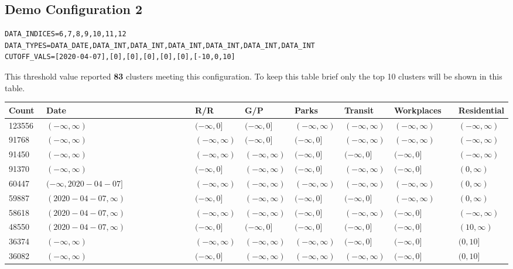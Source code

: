 \documentclass{article}
\begin{document}
\subsection{Demo Configuration 2}
\begin{center}
\footnotesize{
\begin{lstlisting}
DATA_INDICES=6,7,8,9,10,11,12
DATA_TYPES=DATA_DATE,DATA_INT,DATA_INT,DATA_INT,DATA_INT,DATA_INT,DATA_INT
CUTOFF_VALS=[2020-04-07],[0],[0],[0],[0],[0],[-10,0,10]
\end{lstlisting}
}
\end{center}

This threshold value reported \textbf{83} clusters meeting this configuration.  To keep this table brief only the top 10 clusters will be shown in this table.

\hfill
\begin{adjustbox}{width=\textwidth,totalheight=\textheight,keepaspectratio,rotate=0,caption={Demo Configuration 2 - Results},nofloat=table}
\begin{tabular}{ |p{0.08\linewidth}|p{0.38\linewidth}|p{0.1\linewidth}|p{0.1\linewidth}|p{0.1\linewidth}|p{0.1\linewidth}|p{0.15\linewidth}|p{0.15\linewidth}| }
\hline
Count&Date&R/R&G/P&Parks&Transit&Workplaces&Residential \\
\hline
123556&\((-\infty,\infty)\)&\((-\infty,0]\)&\((-\infty,0]\)&\((-\infty,\infty)\)&\((-\infty,\infty)\)&\((-\infty,\infty)\)&\((-\infty,\infty)\) \\
\hline
91768&\((-\infty,\infty)\)&\((-\infty,\infty)\)&\((-\infty,0]\)&\((-\infty,0]\)&\((-\infty,\infty)\)&\((-\infty,\infty)\)&\((-\infty,\infty)\) \\
\hline
91450&\((-\infty,\infty)\)&\((-\infty,\infty)\)&\((-\infty,\infty)\)&\((-\infty,0]\)&\((-\infty,0]\)&\((-\infty,0]\)&\((-\infty,\infty)\) \\
\hline
91370&\((-\infty,\infty)\)&\((-\infty,0]\)&\((-\infty,\infty)\)&\((-\infty,0]\)&\((-\infty,\infty)\)&\((-\infty,0]\)&\((0,\infty)\) \\
\hline
60447&\((-\infty,2020-04-07]\)&\((-\infty,\infty)\)&\((-\infty,\infty)\)&\((-\infty,\infty)\)&\((-\infty,\infty)\)&\((-\infty,\infty)\)&\((0,\infty)\) \\
\hline
59887&\((2020-04-07,\infty)\)&\((-\infty,0]\)&\((-\infty,\infty)\)&\((-\infty,0]\)&\((-\infty,0]\)&\((-\infty,\infty)\)&\((0,\infty)\) \\
\hline
58618&\((2020-04-07,\infty)\)&\((-\infty,\infty)\)&\((-\infty,\infty)\)&\((-\infty,0]\)&\((-\infty,\infty)\)&\((-\infty,0]\)&\((-\infty,\infty)\) \\
\hline
48550&\((2020-04-07,\infty)\)&\((-\infty,0]\)&\((-\infty,0]\)&\((-\infty,0]\)&\((-\infty,0]\)&\((-\infty,0]\)&\((10,\infty)\) \\
\hline
36374&\((-\infty,\infty)\)&\((-\infty,\infty)\)&\((-\infty,\infty)\)&\((-\infty,\infty)\)&\((-\infty,0]\)&\((-\infty,0]\)&\((0,10]\) \\
\hline
36082&\((-\infty,\infty)\)&\((-\infty,0]\)&\((-\infty,\infty)\)&\((-\infty,\infty)\)&\((-\infty,\infty)\)&\((-\infty,0]\)&\((0,10]\) \\
\hline
\end{tabular}
\end{adjustbox}
\end{document}
